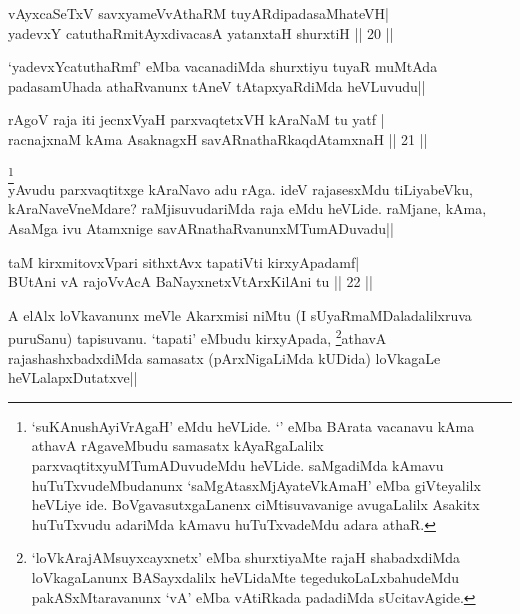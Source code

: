 
\begin{shl}
vAyxcaSeTxV savxyameVvAthaRM tuyARdipadasaMhateVH| \\
yadevxY catuthaRmitAyxdivacasA yatanxtaH shurxtiH \hfill ||  20 || 
\end{shl}

\begin{artha} 
`yadevxYcatuthaRmf' eMba vacanadiMda shurxtiyu tuyaR muMtAda 
padasamUhada athaRvanunx tAneV tAtapxyaRdiMda heVLuvudu||
\end{artha}


\begin{shl}
rAgoV raja iti jecnxVyaH parxvaqtetxVH kAraNaM tu yatf | \\
racnajxnaM kAma AsaknagxH savARnathaRkaqdAtamxnaH \hfill ||  21 || 
\end{shl}

\begin{artha} 
\footnote[1]{`suKAnushAyiVrAgaH' eMdu heVLide. `\stext' eMba BArata 
vacanavu kAma athavA rAgaveMbudu samasatx kAyaRgaLalilx 
parxvaqtitxyuMTumADuvudeMdu heVLide. saMgadiMda kAmavu 
huTuTxvudeMbudanunx `saMgAtasxMjAyateVkAmaH' eMba giVteyalilx heVLiye 
ide. BoVgavasutxgaLanenx ciMtisuvavanige avugaLalilx Asakitx 
huTuTxvudu adariMda kAmavu huTuTxvadeMdu adara athaR.}\\
yAvudu parxvaqtitxge kAraNavo adu rAga. ideV rajasesxMdu tiLiyabeVku, 
kAraNaveVneMdare? raMjisuvudariMda raja eMdu heVLide. raMjane, kAma, 
AsaMga ivu Atamxnige savARnathaRvanunxMTumADuvadu||
\end{artha}


\begin{shl}
taM kirxmitovxVpari sithxtAvx tapatiVti kirxyApadamf| \\
BUtAni vA rajoVvAcA BaNayxnetxV\s tArxKilAni tu \hfill ||  22 || 
\end{shl}

\begin{artha} 
A elAlx loVkavanunx meVle Akarxmisi niMtu (I sUyaRmaMDaladalilxruva 
puruSanu) tapisuvanu. `tapati' eMbudu kirxyApada, 
\footnote[2]{`loVkArajAMsuyxcayxnetx' eMba shurxtiyaMte rajaH 
shabadxdiMda loVkagaLanunx BASayxdalilx heVLidaMte 
tegedukoLaLxbahudeMdu pakASxMtaravanunx `vA' eMba vAtiRkada padadiMda 
sUcitavAgide.}athavA 
rajashashxbadxdiMda samasatx (pArxNigaLiMda kUDida) loVkagaLe 
heVLalapxDutatxve||
\end{artha}

